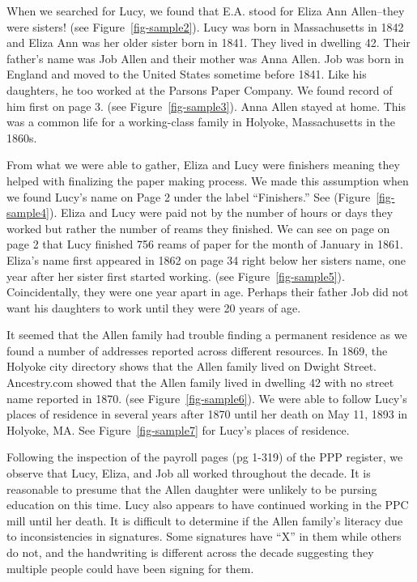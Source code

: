 \documentclass[
  letterpaper,
  DIV=11,
  numbers=noendperiod]{scrartcl}
\begin{document}
When we searched for Lucy, we found that E.A. stood for Eliza Ann
Allen--they were sisters! (see Figure~\ref{fig-sample2}). Lucy was born
in Massachusetts in 1842 and Eliza Ann was her older sister born in
1841. They lived in dwelling 42. Their father's name was Job Allen and
their mother was Anna Allen. Job was born in England and moved to the
United States sometime before 1841. Like his daughters, he too worked at
the Parsons Paper Company. We found record of him first on page 3. (see
Figure~\ref{fig-sample3}). Anna Allen stayed at home. This was a common
life for a working-class family in Holyoke, Massachusetts in the 1860s.

From what we were able to gather, Eliza and Lucy were finishers meaning
they helped with finalizing the paper making process. We made this
assumption when we found Lucy's name on Page 2 under the label
``Finishers.'' See (Figure~\ref{fig-sample4}). Eliza and Lucy were paid
not by the number of hours or days they worked but rather the number of
reams they finished. We can see on page on page 2 that Lucy finished 756
reams of paper for the month of January in 1861. Eliza's name first
appeared in 1862 on page 34 right below her sisters name, one year after
her sister first started working. (see Figure~\ref{fig-sample5}).
Coincidentally, they were one year apart in age. Perhaps their father
Job did not want his daughters to work until they were 20 years of age.

It seemed that the Allen family had trouble finding a permanent
residence as we found a number of addresses reported across different
resources. In 1869, the Holyoke city directory shows that the Allen
family lived on Dwight Street. Ancestry.com showed that the Allen family
lived in dwelling 42 with no street name reported in 1870. (see
Figure~\ref{fig-sample6}). We were able to follow Lucy's places of
residence in several years after 1870 until her death on May 11, 1893 in
Holyoke, MA. See Figure~\ref{fig-sample7} for Lucy's places of
residence.

Following the inspection of the payroll pages (pg 1-319) of the PPP
register, we observe that Lucy, Eliza, and Job all worked throughout the
decade. It is reasonable to presume that the Allen daughter were
unlikely to be pursing education on this time. Lucy also appears to have
continued working in the PPC mill until her death. It is difficult to
determine if the Allen family's literacy due to inconsistencies in
signatures. Some signatures have ``X'' in them while others do not, and
the handwriting is different across the decade suggesting they multiple
people could have been signing for them.
\end{document}
